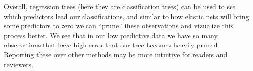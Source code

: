\documentclass[12pt]{article}\usepackage[]{graphicx}\usepackage[]{color}
\begin{document}
\begin{flushleft}
Overall, regression trees (here they are classification trees) can be used to see which predictors lead our classifications, and similar to how elastic nets will bring some predictors to zero we can ``prune'' these observations and vizualize this process better. We see that in our low predictive data we have so many observations that have high error that our tree becomes heavily pruned. Reporting these over other methods may be more intuitive for readers and reviewers.



\end{flushleft}
\end{document}
